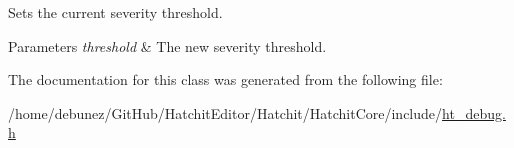 Sets the current severity threshold. 


\begin{DoxyParams}{Parameters}
{\em threshold} & The new severity threshold. \\
\hline
\end{DoxyParams}


The documentation for this class was generated from the following file\+:\begin{DoxyCompactItemize}
\item 
/home/debunez/\+Git\+Hub/\+Hatchit\+Editor/\+Hatchit/\+Hatchit\+Core/include/\hyperlink{ht__debug_8h}{ht\+\_\+debug.\+h}\end{DoxyCompactItemize}
